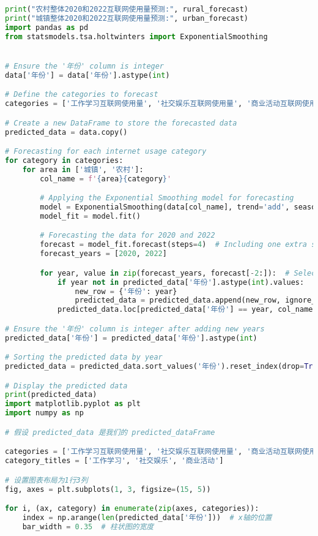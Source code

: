 \begin{lstlisting}[language=python,caption={城乡互联网}]
print("农村整体2020和2022互联网使用量预测:", rural_forecast)
print("城镇整体2020和2022互联网使用量预测:", urban_forecast)
import pandas as pd
from statsmodels.tsa.holtwinters import ExponentialSmoothing


# Ensure the '年份' column is integer
data['年份'] = data['年份'].astype(int)

# Define the categories to forecast
categories = ['工作学习互联网使用量', '社交娱乐互联网使用量', '商业活动互联网使用量']

# Create a new DataFrame to store the forecasted data
predicted_data = data.copy()

# Forecasting for each internet usage category
for category in categories:
    for area in ['城镇', '农村']:
        col_name = f'{area}{category}'

        # Applying the Exponential Smoothing model for forecasting
        model = ExponentialSmoothing(data[col_name], trend='add', seasonal=None)
        model_fit = model.fit()

        # Forecasting the data for 2020 and 2022
        forecast = model_fit.forecast(steps=4)  # Including one extra step to avoid indexing issues
        forecast_years = [2020, 2022]

        for year, value in zip(forecast_years, forecast[-2:]):  # Selecting the last two forecasted values
            if year not in predicted_data['年份'].astype(int).values:
                new_row = {'年份': year}
                predicted_data = predicted_data.append(new_row, ignore_index=True)
            predicted_data.loc[predicted_data['年份'] == year, col_name] = value

# Ensure the '年份' column is integer after adding new years
predicted_data['年份'] = predicted_data['年份'].astype(int)

# Sorting the predicted data by year
predicted_data = predicted_data.sort_values('年份').reset_index(drop=True)

# Display the predicted data
print(predicted_data)
import matplotlib.pyplot as plt
import numpy as np

# 假设 predicted_data 是我们的 predicted_dataFrame

categories = ['工作学习互联网使用量', '社交娱乐互联网使用量', '商业活动互联网使用量']
category_titles = ['工作学习', '社交娱乐', '商业活动']

# 设置图表布局为1行3列
fig, axes = plt.subplots(1, 3, figsize=(15, 5))

for i, (ax, category) in enumerate(zip(axes, categories)):
    index = np.arange(len(predicted_data['年份']))  # x轴的位置
    bar_width = 0.35  # 柱状图的宽度


\end{lstlisting}
